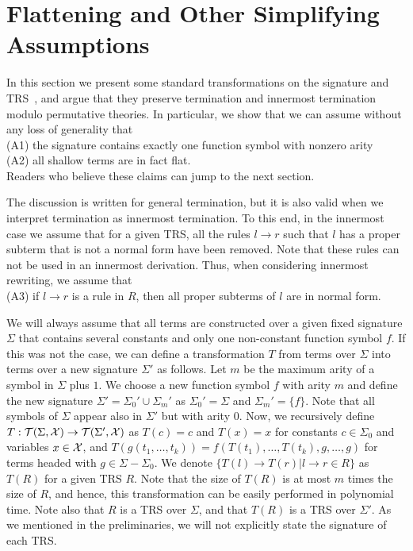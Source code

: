 \documentclass{LMCS}
\theoremstyle{plain}
\def\Tau{{\mathcal T}}
\begin{document}
\section{Flattening and Other Simplifying Assumptions}
\label{sec-flatten}

\noindent In this section we present some standard transformations
on the signature and TRS~\cite{GodoyTiwari05:CADE,DBLP:conf/rta/GodoyHT07}, 
and argue that they preserve
termination and innermost termination modulo permutative theories.
In particular, we show that we can assume without any loss of generality
that \\
(A1) the signature contains exactly one function symbol with nonzero arity
\\
(A2) all shallow terms are in fact flat.
\\
Readers who believe these claims can jump to the next section.

The discussion is
written for general termination, but it is also valid
when we interpret termination as innermost termination.
To this end, in the innermost case we assume that
for a given TRS, all the rules $l\rightarrow r$
such that $l$ has a proper subterm that is not a normal
form have been removed. Note that these rules can not
be used in an innermost derivation.
Thus, when considering innermost rewriting, we assume that
\\
(A3) if $l\rightarrow r$ is a rule in $R$, then all
proper subterms of $l$ are in normal form.

We will always assume that all terms
are constructed over a given fixed signature
$\Sigma$ that contains several constants and
only one non-constant function symbol $f$.
If this was not the case,
we can define a transformation $T$ from
terms over $\Sigma$ into terms over a new signature $\Sigma'$
as follows. Let $m$ be the
maximum arity of a symbol in $\Sigma$ plus $1$. We choose
a new function symbol $f$ with arity $m$ and define the new
signature $\Sigma'=\Sigma_0'\cup\Sigma_m'$ as
$\Sigma_0'=\Sigma$ and $\Sigma_m'=\{f\}$.
Note that all symbols of $\Sigma$ appear also in $\Sigma'$
but with arity $0$.
Now, we recursively define
$T:\Tau(\Sigma,\X)\rightarrow \Tau(\Sigma',\X)$
as $T(c)=c$ and $T(x)=x$ for constants $c\in\Sigma_0$ and variables $x\in{\mathcal X}$,
and $T(g(t_1,\ldots,t_k))=f(T(t_1),\ldots,T(t_k),g,\ldots,g)$
for terms headed with $g\in\Sigma-\Sigma_0$.
We denote $\{T(l)\rightarrow T(r)|l\rightarrow r\in R\}$ as $T(R)$
for a given TRS $R$.
Note that the size of $T(R)$ is at most $m$ times the
size of $R$, and hence, this transformation can be
easily performed in polynomial time.
Note also that $R$ is a TRS over $\Sigma$, and that $T(R)$
is a TRS over $\Sigma'$. As we mentioned in the preliminaries,
we will not explicitly state the signature of each TRS.
\end{document}
